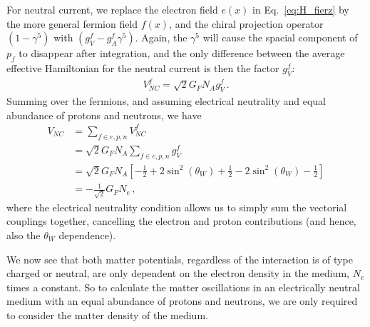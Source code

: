 For neutral current, we replace the electron field $e(x)$ in Eq.~\ref{eq:H_fierz} by the more general fermion field $f(x)$, and the chiral projection operator 
$(1-\gamma^5)$ with $(g_V^f - g_A^f\gamma^5)$. Again, the $\gamma^5$ will cause the spacial component of $p_f$ to disappear after integration, and the 
only difference between the average effective Hamiltonian for the neutral current is then the factor $g_V^f$:
\begin{align}
    V^f_{NC} = \sqrt{2}G_F N_A g_V^f\,.
\end{align}
Summing over the fermions, and assuming electrical neutrality and equal abundance of protons and neutrons, we have
\begin{align}
    V_{NC} &= \sum_{f \in {e,p,n}} V^f_{NC} \nonumber \\
           &= \sqrt{2}G_F N_A \sum_{f \in {e,p,n}} g_V^f \nonumber \\
           &= \sqrt{2}G_F N_A\left[ -\frac{1}{2}+2\sin^2{(\theta_W)} + \frac{1}{2}-2\sin^2{(\theta_W)} -\frac{1}{2} \right] \nonumber \\
           &= -\frac{1}  {\sqrt{2}} G_F N_e\,,
\end{align}
where the electrical neutrality condition allows us to simply sum the vectorial couplings together, cancelling the electron and proton contributions (and hence, also the $\theta_W$ dependence).

We now see that both matter potentials, regardless of the interaction is of type charged or neutral, are only dependent on the electron density in the medium, $N_e$ times a constant.
So to calculate the matter oscillations in an electrically neutral medium with an equal abundance of protons and neutrons, we are only required to consider the matter density of the medium.

